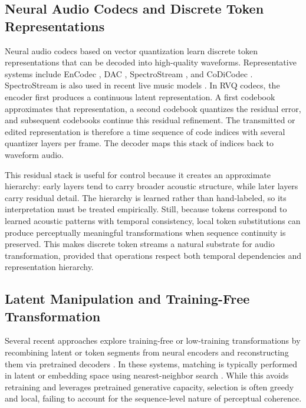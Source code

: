 \documentclass[twoside,a4paper]{article}
\begin{document}
\subsection{Neural Audio Codecs and Discrete Token Representations}

Neural audio codecs based on vector quantization learn discrete token representations that can be decoded into high-quality waveforms. Representative systems include EnCodec \cite{Defossez:2022:EnCodec}, DAC \cite{Kumar:2023:DAC}, SpectroStream \cite{Li:2025:SpectroStream}, and CoDiCodec \cite{Pasini:2025:CoDiCodec}. SpectroStream is also used in recent live music models \cite{Caillon:2025:LiveMusicModels}. In RVQ codecs, the encoder first produces a continuous latent representation. A first codebook approximates that representation, a second codebook quantizes the residual error, and subsequent codebooks continue this residual refinement. The transmitted or edited representation is therefore a time sequence of code indices with several quantizer layers per frame. The decoder maps this stack of indices back to waveform audio.

This residual stack is useful for control because it creates an approximate hierarchy: early layers tend to carry broader acoustic structure, while later layers carry residual detail. The hierarchy is learned rather than hand-labeled, so its interpretation must be treated empirically. Still, because tokens correspond to learned acoustic patterns with temporal consistency, local token substitutions can produce perceptually meaningful transformations when sequence continuity is preserved. This makes discrete token streams a natural substrate for audio transformation, provided that operations respect both temporal dependencies and representation hierarchy.

\subsection{Latent Manipulation and Training-Free Transformation}

Several recent approaches explore training-free or low-training transformations by recombining latent or token segments from neural encoders and reconstructing them via pretrained decoders \cite{baas2023voice,tokui2025latent}. In these systems, matching is typically performed in latent or embedding space using nearest-neighbor search \cite{baas2023voice,tokui2025latent}. While this avoids retraining and leverages pretrained generative capacity, selection is often greedy and local, failing to account for the sequence-level nature of perceptual coherence.
\end{document}
